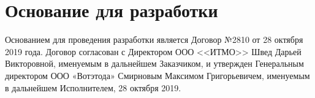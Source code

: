 \section{Основание для разработки}

Основанием для проведения разработки является Договор №2810 от 28 октября 2019 года. Договор согласован с Директором ООО <<ИТМО>> Швед Дарьей Викторовной, именуемым в дальнейшем Заказчиком, и утвержден Генеральным директором ООО «Вотэтода» Смирновым Максимом Григорьевичем, именуемым в дальнейшем Исполнителем, 28 октября 2019.